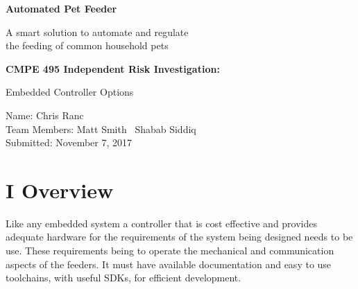 \documentclass[12pt]{article}
\newcommand{\projectDescription}{A smart solution to automate and regulate \\the feeding of common household pets}
\newcommand{\projectTitle}{Automated Pet Feeder}
\newcommand{\yourname}{Chris Ranc}
\newcommand{\myname}{Matt Smith}
\newcommand{\anothername}{Shabab Siddiq}
\newcommand{\dateSubmitted}{November 7, 2017}
\newcommand{\componentDescription}{Embedded Controller Options}
\begin{document}
\thispagestyle{empty}
    \vspace*{2.5cm}
    \begin{center}
        \LARGE
        \textbf{\projectTitle}

        \Large
        \projectDescription

    \vspace*{2.5cm}
        \large
        \textbf{CMPE 495 Independent Risk Investigation:}

        \componentDescription
    \end{center}

    \vspace*{2cm}

    \begin{multicols}{2}
        \phantom{LaTeX doesn't like empty columns} %
        \columnbreak{}
        \begin{raggedright}

        Name: \yourname\\
        Team Members: \myname\
        \phantom{Team Members:} \anothername\\
        Submitted: \dateSubmitted\\
        \vspace{\baselineskip}
        \end{raggedright}
    \end{multicols}
\newpage
%
%
\renewcommand{\cftaftertoctitle}{\thispagestyle{empty}}
\renewcommand\cftsecleader{\cftdotfill{\cftdotsep}}
\tableofcontents
\newpage

\section{I Overview}
Like any embedded system a controller that is cost effective and provides adequate hardware
for the requirements of the system being designed needs to be use.  These requirements being to operate the mechanical
and communication aspects of the feeders.  It must have available documentation and easy to use
toolchains, with useful SDKs, for efficient development.
\end{document}
